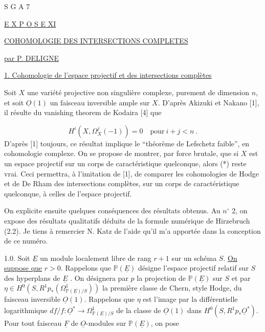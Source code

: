 


S G A 7


\underline{E X P O S E  XI}


\underline{COHOMOLOGIE DES INTERSECTIONS COMPLETES}


\underline{par P. DELIGNE}


\underline{1. Cohomologie de l'espace projectif et des intersections compl\`etes}

Soit $X$ une vari\'et\'e projective non singuli\`ere complexe, purement de dimension $n$, et soit $\underline{O}(1)$ un faisceau inversible ample sur $X$. D'apr\`es Akizuki et Nakano [1], il r\'esulte du vanishing theorem de Kodaira [4] que

\begin{equation}\tag{*}
H^i(X,\Omega^j_X (-1)) = 0 \quad \mathrm{pour}\ i+j < n \ .
\end{equation}
D'apr\`es [1] toujours, ce r\'esultat implique le ``th\'eor\`eme de Lefschetz faible'', en cohomologie complexe. On se propose de montrer, par force brutale, que si $X$ est un espace projectif sur un corps de caract\'eristique quelconque, alors (*) reste vrai. Ceci permettra, \`a l'imitation de [1], de comparer les cohomologies de Hodge et de De Rham des intersections compl\`etes, sur un corps de caract\'eristique quelconque, \`a celles de l'espace projectif.

On explicite ensuite quelques cons\'equences des r\'esultats obtenus. Au $n^{\circ}$ 2, on expose des r\'esultats qualitatifs d\'eduits de la formule num\'erique de Hirzebruch (2.2). Je tiens \`a remercier N. Katz de l'aide qu'il m'a apport\'ee dans la conception de ce num\'ero.

1.0. Soit $\underline{E}$ un module localement libre de rang $r+1$ sur un sch\'ema $S$. \underline{On suppose que} $r > 0$. Rappelons que $\mathbb{P}(\underline{E})$ d\'esigne l'espace projectif relatif sur $S$ des hyperplans de $\underline{E}$ . On d\'esignera par $p$ la projection de $\mathbb{P}(\underline{E})$ sur $S$ et par $\eta \in H^0(S,R^1 p_*(\Omega^1_{\mathbb{P}(\underline{E})/S}))$ la premi\`ere classe de Chern, style Hodge, du faisceau
inversible $\underline{O}(1)$. Rappelons que $\eta$ est l'image par la diff\'erentielle logarithmique $df/f : \underline{O}^* \longrightarrow \Omega^1_{\mathbb{P}(\underline{E})/S}$ de la classe de $\underline{O}(1)$ dans $H^0(S,R^1 p_* \underline{O}^*)$. Pour tout faisceau $\underline{F}$ de $\underline{O}$-modules sur $\mathbb{P}(\underline{E})$, on pose

